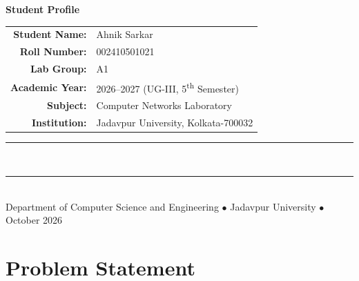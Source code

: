 \documentclass[11pt,a4paper]{article}
\begin{document}
\begin{titlepage}
\begin{tcolorbox}[
    colback=lightgold,
    colframe=goldaccent!80!navyblue,
    boxrule=0.7pt,
    arc=1.5mm,
    width=0.82\textwidth,
    left=10pt, right=10pt, top=7pt, bottom=7pt
]
\centering
\textbf{\color{navyblue}\normalsize Student Profile}\\[0.2cm]
\renewcommand{\arraystretch}{1.2}
\small
\begin{tabular}{r l}
    \textbf{\color{navyblue}Student Name:} & Ahnik Sarkar \\
    \textbf{\color{navyblue}Roll Number:} & 002410501021 \\
    \textbf{\color{navyblue}Lab Group:} & A1 \\
    \textbf{\color{navyblue}Academic Year:} & 2026--2027 (UG-III, 5\textsuperscript{th} Semester) \\
    \textbf{\color{navyblue}Subject:} & Computer Networks Laboratory \\
    \textbf{\color{navyblue}Institution:} & Jadavpur University, Kolkata-700032 \\
\end{tabular}
\end{tcolorbox}

\vfill

\rule{9cm}{0.6pt}\\[-0.2cm]
\rule{11cm}{1.2pt}\\[0.2cm]

{\scriptsize\color{gray}Department of Computer Science and Engineering $\bullet$ Jadavpur University $\bullet$ October 2026}

\end{titlepage}
\hypersetup{pageanchor=true}

\clearpage
{}
\pagestyle{fancy}

\tableofcontents

\vspace{0.6cm}

\section{Problem Statement}
\end{document}
